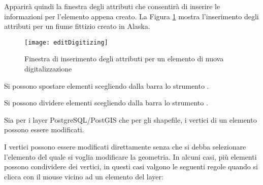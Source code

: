 Apparirà quindi la finestra degli attributi che consentirà di inserire le
informazioni per l'elemento appena creato.
La Figura \ref{fig:vector_digitising} mostra l'inserimento degli attributi per
un fiume fittizio creato in Alaska.

\begin{figure}[ht]
   \begin{center}
   \caption{Finestra di inserimento degli attributi per un elemento di nuova
   digitalizzazione \nixcaption}\label{fig:vector_digitising}\smallskip
   \texttt{[image: editDigitizing]}
\end{center}  
\end{figure}

\begin{Tip}[ht]\caption{\textsc{Tipologie di attributo}}
\end{Tip}


Si possono spostare elementi scegliendo dalla barra lo strumento
.


Si possono dividere elementi scegliendo dalla barra lo strumento .


Sia per i layer PostgreSQL/PostGIS che per gli shapefile, i vertici di un
elemento possono essere modificati. 

I vertici possono essere modificati direttamente senza che si debba
selezionare l'elemento del quale si voglia modificare la geometria.
In alcuni casi, più elementi possono condividere dei vertici, in questi casi
valgono le seguenti regole quando si clicca con il mouse vicino ad un elemento
del layer:

